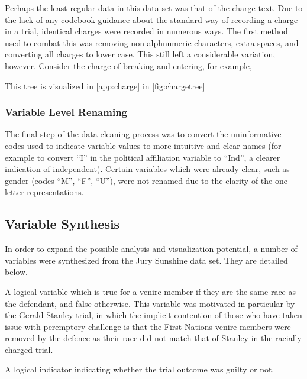 Perhaps the least regular data in this data set was that of the charge text. Due to the lack of any codebook guidance about the
standard way of recording a charge in a trial, identical charges were recorded in numerous ways. The first method used to combat
this was removing non-alphnumeric characters, extra spaces, and converting all charges to lower case. This still left a
considerable variation, however. Consider the charge of breaking and entering, for example,

This tree is visualized in \ref{app:charge} in \ref{fig:chargetree}

\subsubsection{Variable Level Renaming}

The final step of the data cleaning process was to convert the uninformative codes used to indicate variable values to more
intuitive and clear names (for example to convert ``I'' in the political affiliation variable to ``Ind'', a clearer indication of
independent). Certain variables which were already clear, such as gender (codes ``M'', ``F'', ``U''), were not renamed due to the
clarity of the one letter representations.

\subsection{Variable Synthesis}

In order to expand the possible analysis and visualization potential, a number of variables were synthesized from the Jury
Sunshine data set. They are detailed below.

\begin{description}
  \item[Race Match] A logical variable which is true for a venire member if they are the same race as the defendant, and false
    otherwise. This variable was motivated in particular by the Gerald Stanley trial, in which the implicit contention of those
    who have taken issue with peremptory challenge is that the First Nations venire members were removed by the defence as their
    race did not match that of Stanley in the racially charged trial.
  \item[Guilty] A logical indicator indicating whether the trial outcome was guilty or not.
  \item
\end{description}

